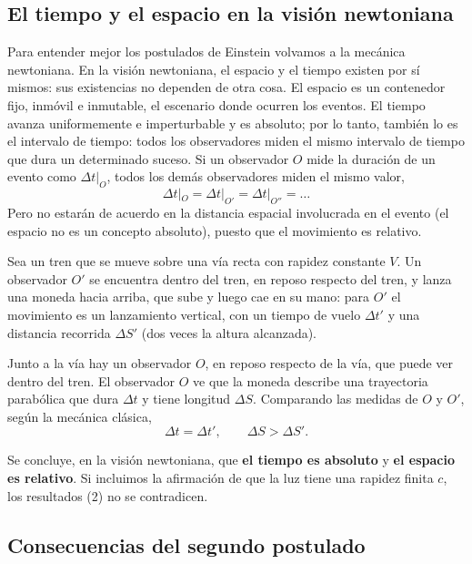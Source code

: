 \subsection{El tiempo y el espacio en la visión newtoniana}

Para entender mejor los postulados de Einstein volvamos a la mecánica
newtoniana. En la visión newtoniana, el espacio y el tiempo existen por
sí mismos: sus existencias no dependen de otra cosa. El espacio es un
contenedor fijo, inmóvil e inmutable, el escenario donde ocurren los
eventos. El tiempo avanza uniformemente e imperturbable y es absoluto;
por lo tanto, también lo es el intervalo de tiempo: todos los
observadores miden el mismo intervalo de tiempo que dura un determinado
suceso. Si un observador $O$ mide la duración de un evento como
$\Delta t|_O$, todos los demás observadores miden el mismo valor,
\[
\Delta t|_O = \Delta t|_{O'} = \Delta t|_{O''} = \dots
\]
Pero no estarán de acuerdo en la distancia espacial involucrada en el
evento (el espacio no es un concepto absoluto), puesto que el
movimiento es relativo.

\begin{ejemplo}
Sea un tren que se mueve sobre una vía recta con rapidez constante $V$.
Un observador $O'$ se encuentra dentro del tren, en reposo respecto del
tren, y lanza una moneda hacia arriba, que sube y luego cae en su mano:
para $O'$ el movimiento es un lanzamiento vertical, con un tiempo de
vuelo $\Delta t'$ y una distancia recorrida $\Delta S'$ (dos veces la
altura alcanzada).

Junto a la vía hay un observador $O$, en reposo respecto de la vía, que
puede ver dentro del tren. El observador $O$ ve que la moneda describe
una trayectoria parabólica que dura $\Delta t$ y tiene longitud
$\Delta S$. Comparando las medidas de $O$ y $O'$, según la mecánica
clásica,
\[
\Delta t = \Delta t', \qquad \Delta S > \Delta S'. \tag{2}
\]
\end{ejemplo}

Se concluye, en la visión newtoniana, que \textbf{el tiempo es absoluto}
y \textbf{el espacio es relativo}. Si incluimos la afirmación de que la
luz tiene una rapidez finita $c$, los resultados (2) no se contradicen.

\subsection{Consecuencias del segundo postulado}

